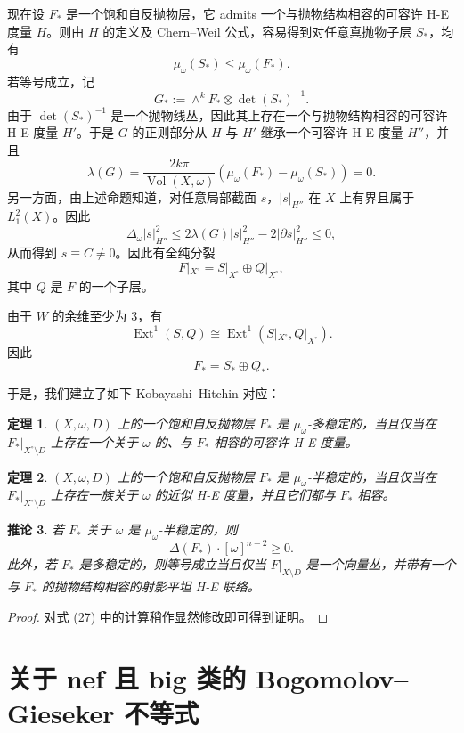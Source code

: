 \documentclass[12pt,a4paper]{article}
\newtheorem{theorem}{定理}[section]
\newtheorem{corollary}[theorem]{推论}
\newcommand{\Vol}{\operatorname{Vol}}
\begin{document}
现在设 \(F_*\) 是一个饱和自反抛物层，它 admits 一个与抛物结构相容的可容许 H-E 度量 \(H\)。则由 \(H\) 的定义及 Chern--Weil 公式，容易得到对任意真抛物子层 \(S_*\)，均有
\[
\mu_\omega(S_*)\le \mu_\omega(F_*).
\]
若等号成立，记
\[
G_*:=\wedge^k F_*\otimes \det(S_*)^{-1}.
\]
由于 \(\det(S_*)^{-1}\) 是一个抛物线丛，因此其上存在一个与抛物结构相容的可容许 H-E 度量 \(H'\)。于是 \(G\) 的正则部分从 \(H\) 与 \(H'\) 继承一个可容许 H-E 度量 \(H''\)，并且
\[
\lambda(G)
=
\frac{2k\pi}{\Vol(X,\omega)}(\mu_\omega(F_*)-\mu_\omega(S_*))
=0.
\]
另一方面，由上述命题知道，对任意局部截面 \(s\)，\(|s|_{H''}\) 在 \(X\) 上有界且属于 \(L_1^2(X)\)。因此
\[
\Delta_\omega |s|_{H''}^2
\le
2\lambda(G)|s|_{H''}^2-2|\partial s|_{H''}^2
\le 0,
\]
从而得到 \(s\equiv C\neq 0\)。因此有全纯分裂
\[
F|_{X^\circ}=S|_{X^\circ}\oplus Q|_{X^\circ},
\]
其中 \(Q\) 是 \(F\) 的一个子层。

由于 \(W\) 的余维至少为 3，有
\[
\operatorname{Ext}^1(S,Q)\cong \operatorname{Ext}^1(S|_{X^\circ},Q|_{X^\circ}).
\]
因此
\[
F_*=S_*\oplus Q_*.
\]

于是，我们建立了如下 Kobayashi--Hitchin 对应：

\begin{theorem}
\((X,\omega,D)\) 上的一个饱和自反抛物层 \(F_*\) 是 \(\mu_\omega\)-多稳定的，当且仅当在 \(F_*|_{X^\circ\setminus D}\) 上存在一个关于 \(\omega\) 的、与 \(F_*\) 相容的可容许 H-E 度量。
\end{theorem}

\begin{theorem}
\((X,\omega,D)\) 上的一个饱和自反抛物层 \(F_*\) 是 \(\mu_\omega\)-半稳定的，当且仅当在 \(F_*|_{X^\circ\setminus D}\) 上存在一族关于 \(\omega\) 的近似 H-E 度量，并且它们都与 \(F_*\) 相容。
\end{theorem}

\begin{corollary}
若 \(F_*\) 关于 \(\omega\) 是 \(\mu_\omega\)-半稳定的，则
\[
\Delta(F_*)\cdot [\omega]^{n-2}\ge 0.
\]
此外，若 \(F_*\) 是多稳定的，则等号成立当且仅当 \(F|_{X\setminus D}\) 是一个向量丛，并带有一个与 \(F_*\) 的抛物结构相容的射影平坦 H-E 联络。
\end{corollary}

\begin{proof}
对式 (27) 中的计算稍作显然修改即可得到证明。
\end{proof}

\section{关于 nef 且 big 类的 Bogomolov--Gieseker 不等式}
\end{document}
